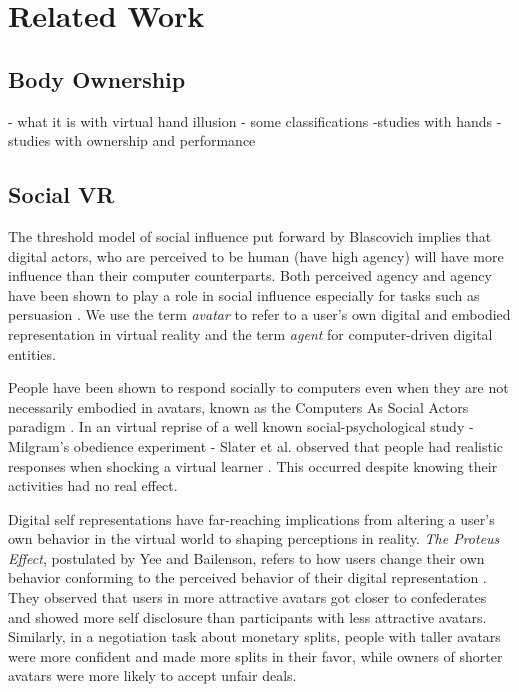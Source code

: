 \section{Related Work}

\subsection{Body Ownership}
- what it is with virtual hand illusion
- some classifications
-studies with hands
- studies with ownership and performance

\subsection{Social VR}

The threshold model of social influence put forward by Blascovich \cite{blascovich2002theoretical} implies that digital actors, who are perceived to be human (have high agency) will have more influence than their computer counterparts. Both perceived agency and agency have been shown to play a role in social influence especially for tasks such as persuasion \cite{guadagno2007virtual,fox2015avatars}. 
We use the term \textit{avatar} to refer to a user’s own digital and embodied representation in virtual reality and the term \textit{agent} for computer-driven digital entities. 

People have been shown to respond socially to computers even when they are not necessarily embodied in avatars, known as the Computers As Social Actors paradigm \cite{nass1994computers}. 
In an virtual reprise of a well known social-psychological study - Milgram’s obedience experiment - Slater et al. observed that people had realistic responses when shocking a virtual learner \cite{slater2006virtual}.
This occurred despite knowing their activities had no real effect.

Digital self representations have far-reaching implications from altering a user’s own behavior in the virtual world to shaping perceptions in reality.
\textit{The Proteus Effect}, postulated by Yee and Bailenson, refers to how users change their own behavior conforming to the perceived behavior of their digital representation \cite{yee2007proteus}. 
 They observed that users in more attractive avatars got closer to confederates and showed more self disclosure than participants with less attractive avatars. Similarly, in a negotiation task about monetary splits, people with taller avatars were more confident and made more splits in their favor, while owners of shorter avatars were more likely to accept unfair deals. 

